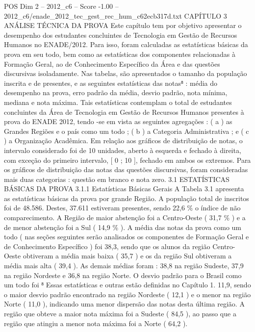 \begin{textsample}{POS Dim 2 – 2012\_c6 – Score -1.00 – 2012\_c6/enade\_2012\_tec\_gest\_rec\_hum\_c62ecb317d.txt}  \label{ex:f2_pos_252}
CAPÍTULO 3 ANÁLISE TÉCNICA DA PROVA Este capítulo tem por objetivo apresentar o desempenho dos estudantes concluintes de Tecnologia em Gestão de Recursos Humanos no ENADE/2012.
Para isso, foram calculadas as estatísticas básicas da prova em seu todo, bem como as estatísticas dos componentes relacionadas à Formação Geral, ao de Conhecimento Específico da Área e das questões discursivas isoladamente.
Nas tabelas, são apresentados o tamanho da população inscrita e de presentes, e as seguintes estatísticas das notas⁸ : média do desempenho na prova, erro padrão da média, desvio padrão, nota mínima, mediana e nota máxima.
Tais estatísticas contemplam o total de estudantes concluintes da Área de Tecnologia em Gestão de Recursos Humanos presentes à prova do ENADE 2012, tendo -se em vista as seguintes agregações : ( a ) as Grandes Regiões e o país como um todo ; ( b ) a Categoria Administrativa ; e ( c ) a Organização Acadêmica.
Em relação aos gráficos de distribuição de notas, o intervalo considerado foi de 10 unidades, aberto à esquerda e fechado à direita, com exceção do primeiro intervalo, [ 0 ; 10 ], fechado em ambos os extremos.
Para os gráficos de distribuição das notas das questões discursivas, foram consideradas mais duas categorias : questão em branco e nota zero. 3.1 ESTATÍSTICAS BÁSICAS DA PROVA 3.1.1 Estatísticas Básicas Gerais A Tabela 3.1 apresenta as estatísticas básicas da prova por grande Região.
A população total de inscritos foi de 48.586.
Destes, 37.611 estiveram presentes, sendo 22,6 \% o índice de não comparecimento.
A Região de maior abstenção foi a Centro-Oeste ( 31,7 \% ) e a de menor abstenção foi a Sul ( 14,9 \% ).
A média das notas da prova como um todo ( nas seções seguintes serão analisados os componentes de Formação Geral e de Conhecimento Específico ) foi 38,3, sendo que os alunos da região Centro-Oeste obtiveram a média mais baixa ( 35,7 ) e os da região Sul obtiveram a média mais alta ( 39,4 ).
As demais médias foram : 38,8 na região Sudeste, 37,9 na região Nordeste e 36,8 na região Norte.
O desvio padrão para o Brasil como um todo foi ⁸ Essas estatísticas e outras estão definidas no Capítulo 1. 11,9, sendo o maior desvio padrão encontrado na região Nordeste ( 12,1 ) e o menor na região Norte ( 11,0 ), indicando uma menor dispersão das notas desta última região.
A região que obteve a maior nota máxima foi a Sudeste ( 84,5 ), ao passo que a região que atingiu a menor nota máxima foi a Norte ( 64,2 ).

\end{textsample}
